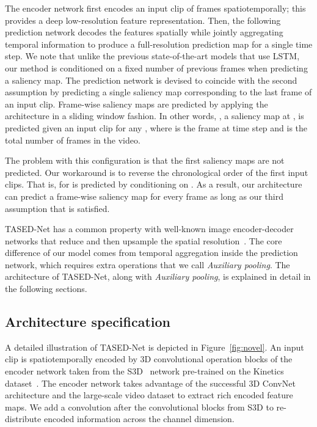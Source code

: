 \documentclass[10pt,twocolumn,letterpaper]{article}
\newcommand{\modelname}{TASED-Net}
\newcommand{\auxpnamet}{Auxiliary pooling}
\newcommand{\auxpname}{\textit{\auxpnamet}}
\begin{document}
  The encoder network first encodes an input clip of  frames spatiotemporally; this provides a deep low-resolution feature representation. Then, the following prediction network decodes the features spatially while jointly aggregating temporal information to produce a full-resolution prediction map for a single time step. We note that unlike the previous state-of-the-art models that use LSTM, our method is conditioned on a fixed number of previous frames when predicting a saliency map. The prediction network is devised to coincide with the second assumption by predicting a single saliency map corresponding to the last frame of an input clip. Frame-wise saliency maps are predicted by applying the architecture in a sliding window fashion. In other words, , a saliency map at , is predicted given an input clip  for any , where  is the frame at time step  and  is the total number of frames in the video.
  
  The problem with this configuration is that the first  saliency maps are not predicted. Our workaround is to reverse the chronological order of the first  input clips. That is,  for  is predicted by conditioning on . As a result, our architecture can predict a frame-wise saliency map for every frame as long as our third assumption that  is satisfied. 

 \modelname{} has a common property with well-known image encoder-decoder networks that reduce and then upsample the spatial resolution~\cite{badrinarayanan2015segnet, noh2015learning, ronneberger2015u}. The core difference of our model comes from temporal aggregation inside the prediction network, which requires extra operations that we call \auxpname{}. The architecture of \modelname{}, along with \auxpname{}, is explained in detail in the following sections.

\subsection{Architecture specification} \label{subsec:propose}

A detailed illustration of \modelname{} is depicted in Figure~\ref{fig:novel}. An input clip is spatiotemporally encoded by 3D convolutional operation blocks of the encoder network taken from the S3D~\cite{xie2018rethinking} network pre-trained on the Kinetics dataset~\cite{kay2017kinetics}. The encoder network takes advantage of the successful 3D ConvNet architecture and the large-scale video dataset to extract rich encoded feature maps. We add a  convolution after the convolutional blocks from S3D to re-distribute encoded information across the channel dimension.
\end{document}
